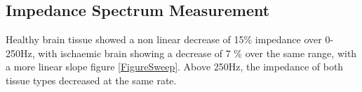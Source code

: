 \subsection{Impedance Spectrum Measurement}
Healthy brain tissue showed a non linear decrease of 15\% impedance over 0-250Hz, with ischaemic brain showing a decrease of 7 \% over the same range, with a more linear slope figure \ref{FigureSweep}. Above 250Hz, the impedance of both tissue types decreased at the same rate. 